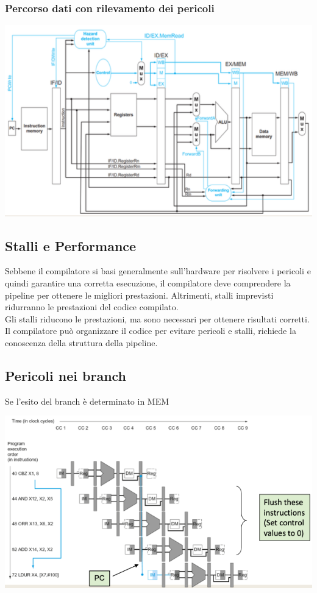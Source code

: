 \documentclass[12pt,a4paper]{article}
\begin{document}
\subsubsection{Percorso dati con rilevamento dei pericoli}
\begin{center}
\includegraphics[width=0.6\columnwidth]{img/datapath_loaduse.png}
\end{center}

\subsection{Stalli e Performance}
Sebbene il compilatore si basi generalmente sull'hardware per risolvere i pericoli e quindi garantire una corretta esecuzione, il compilatore deve comprendere la pipeline per ottenere le migliori prestazioni. Altrimenti, stalli imprevisti ridurranno le prestazioni del codice compilato.\\
Gli stalli riducono le prestazioni, ma sono necessari per ottenere risultati corretti. Il compilatore può organizzare il codice per evitare pericoli e stalli, richiede la conoscenza della struttura della pipeline.

\subsection{Pericoli nei branch}
Se l'esito del branch è determinato in MEM
\begin{center}
\includegraphics[width=0.6\columnwidth]{img/branch_hazard.png}
\end{center}
\end{document}
